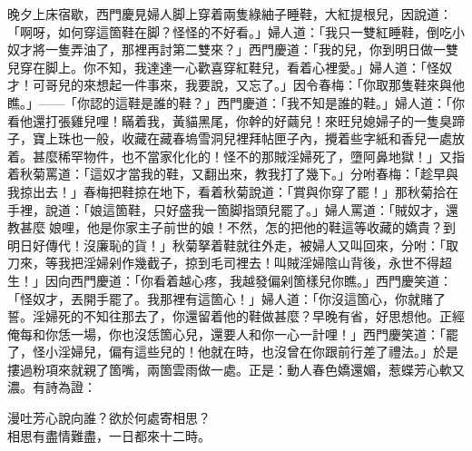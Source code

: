 晚夕上床宿歇，西門慶見婦人脚上穿着兩隻綠紬子睡鞋，大紅提根兒，因說道：「啊呀，如何穿這箇鞋在脚？怪怪的不好看。」婦人道：「我只一雙紅睡鞋，倒吃小奴才將一隻弄油了，那裡再討第二雙來？」西門慶道：「我的兒，你到明日做一雙兒穿在脚上。你不知，我達達一心歡喜穿紅鞋兒，看着心裡愛。」婦人道：「怪奴才！可哥兒的來想起一件事來，我要說，又忘了。」因令春梅：「你取那隻鞋來與他瞧。」——「你認的這鞋是誰的鞋？」西門慶道：「我不知是誰的鞋。」婦人道：「你看他還打張雞兒哩！瞞着我，黃貓黑尾，你幹的好繭兒！來旺兒媳婦子的一隻臭蹄子，寶上珠也一般，收藏在藏春塢雪洞兒裡拜帖匣子內，攪着些字紙和香兒一處放着。甚麼稀罕物件，也不當家化化的！怪不的那賊淫婦死了，墮阿鼻地獄！」{}又指着秋菊罵道：「這奴才當我的鞋，又翻出來，教我打了幾下。」分咐春梅：「趁早與我掠出去！」春梅把鞋掠在地下，看着秋菊說道：「賞與你穿了罷！」那秋菊拾在手裡，說道：「娘這箇鞋，只好盛我一箇脚指頭兒罷了。」婦人罵道：「賊奴才，還教甚麼𣭈娘哩，他是你家主子前世的娘！不然，怎的把他的鞋這等收藏的嬌貴？到明日好傳代！沒廉恥的貨！」秋菊拏着鞋就往外走，被婦人又叫回來，分咐：「取刀來，等我把淫婦剁作幾截子，掠到毛司裡去！叫賊淫婦陰山背後，永世不得超生！」{}因向西門慶道：「你看着越心疼，我越發偏剁箇樣兒你瞧。」西門慶笑道：「怪奴才，丟開手罷了。我那裡有這箇心！」婦人道：「你沒這箇心，你就賭了誓。淫婦死的不知往那去了，你還留着他的鞋做甚麼？早晚有省，好思想他。正經俺每和你恁一場，你也沒恁箇心兒，還要人和你一心一計哩！」{}西門慶笑道：「罷了，怪小淫婦兒，偏有這些兒的！他就在時，也沒曾在你跟前行差了禮法。」於是摟過粉項來就親了箇嘴，兩箇雲雨做一處。正是：動人春色嬌還媚，惹蝶芳心軟又濃。有詩為證：

\begin{myquote}
漫吐芳心說向誰？欲於何處寄相思？\\相思有盡情難盡，一日都來十二時。
\end{myquote}

